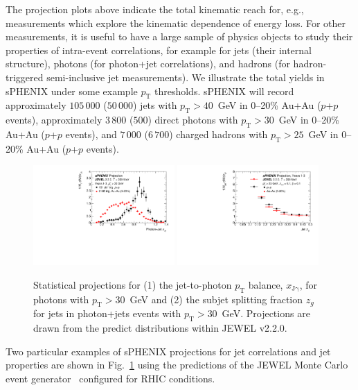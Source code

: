 The projection plots above indicate the total kinematic reach for, e.g., measurements which explore the kinematic dependence of energy loss. For other measurements, it is useful to have a large sample of physics objects to study their properties of intra-event correlations, for example for jets (their internal structure), photons (for photon+jet correlations), and hadrons (for hadron-triggered semi-inclusive jet measurements). We illustrate the total yields in sPHENIX under some example $p_\mathrm{T}$ thresholds. sPHENIX will record approximately $105\,000$ ($50\,000$) jets with $p_\mathrm{T} > 40$~GeV in 0--20\% Au+Au ($p$+$p$ events), approximately $3\,800$ ($500$) direct photons with $p_\mathrm{T} > 30$~GeV in 0--20\% Au+Au ($p$+$p$ events), and $7\,000$ ($6\,700$) charged hadrons with $p_\mathrm{T} > 25$~GeV in 0--20\% Au+Au ($p$+$p$ events). 

\begin{figure}[h]
\centering
\includegraphics[width=0.48\textwidth]{figs/xJg_1.pdf}
\includegraphics[width=0.48\textwidth]{figs/zg_1.pdf}
\caption{Statistical projections for (1) the jet-to-photon $p_\mathrm{T}$ balance, $x_\mathrm{J\gamma}$, for photons with $p_\mathrm{T} > 30$~GeV and (2) the subjet splitting fraction $z_g$ for jets in photon+jets events with $p_\mathrm{T} > 30$~GeV. Projections are drawn from the predict distributions within JEWEL v2.2.0.}
\label{fig:jet_JEWEL_proj}
\end{figure}

Two particular examples of sPHENIX projections for jet correlations and jet properties are shown in Fig.~\ref{fig:jet_JEWEL_proj} using the predictions of the JEWEL Monte Carlo event generator~\cite{KunnawalkamElayavalli:2016ttl} configured for RHIC conditions. 

